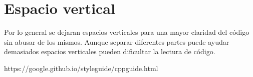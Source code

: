 
\section{Espacio vertical}

Por lo general se dejaran espacios verticales para una mayor claridad del código sin abusar de los mismos. Aunque separar diferentes partes puede ayudar demasiados espacios verticales pueden dificultar la lectura de código.



 https://google.github.io/styleguide/cppguide.html